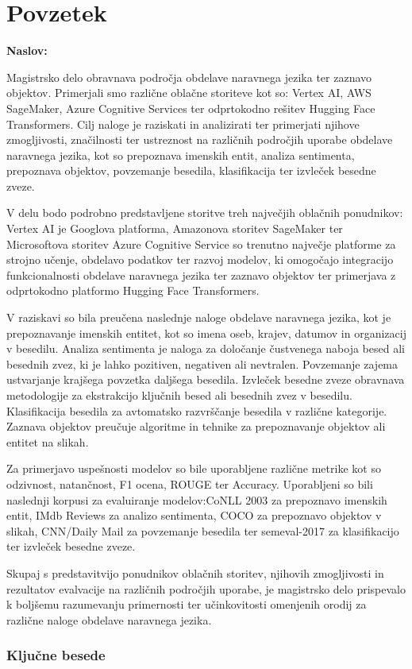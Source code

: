 \chapter*{Povzetek}

\noindent\textbf{Naslov:} \ttitle
\bigskip

Magistrsko delo obravnava področja obdelave naravnega jezika ter zaznavo objektov. Primerjali smo različne oblačne storiteve kot so: Vertex AI, AWS SageMaker, Azure Cognitive Services ter odprtokodno rešitev Hugging Face Transformers. Cilj naloge je raziskati in analizirati ter primerjati njihove zmogljivosti, značilnosti ter ustreznost na različnih področjih uporabe obdelave naravnega jezika, kot so prepoznava imenskih entit, analiza sentimenta, prepoznava objektov, povzemanje besedila, klasifikacija ter izvleček besedne zveze.

V delu bodo podrobno predstavljene storitve treh največjih oblačnih ponudnikov: Vertex AI je Googlova platforma, Amazonova storitev SageMaker ter Microsoftova storitev Azure Cognitive Service so trenutno največje platforme za strojno učenje, obdelavo podatkov ter razvoj modelov, ki omogočajo integracijo funkcionalnosti obdelave naravnega jezika ter zaznavo objektov ter primerjava z odprtokodno platformo Hugging Face Transformers.

V raziskavi so bila preučena naslednje naloge obdelave naravnega jezika, kot je prepoznavanje imenskih entitet, kot so imena oseb, krajev, datumov in organizacij v besedilu.
Analiza sentimenta je naloga za določanje čustvenega naboja besed ali besednih zvez, ki je lahko pozitiven, negativen ali nevtralen. Povzemanje zajema ustvarjanje krajšega povzetka daljšega besedila. Izvleček besedne zveze obravnava metodologije za ekstrakcijo ključnih besed ali besednih zvez v besedilu. 
Klasifikacija besedila za avtomatsko razvrščanje besedila v različne kategorije. Zaznava objektov preučuje algoritme in tehnike za prepoznavanje objektov ali entitet na slikah.

Za primerjavo uspešnosti modelov so bile uporabljene različne metrike kot so odzivnost, natančnost, F1 ocena, ROUGE ter Accuracy. Uporabljeni so bili naslednji korpusi za  evaluiranje modelov:CoNLL 2003 za prepoznavo imenskih entit, IMdb Reviews za analizo sentimenta, COCO za prepoznavo objektov v slikah, CNN/Daily Mail za povzemanje besedila ter semeval-2017 za klasifikacijo ter izvleček besedne zveze.

Skupaj s predstavitvijo ponudnikov oblačnih storitev, njihovih zmogljivosti in rezultatov evalvacije na različnih področjih uporabe, je magistrsko delo prispevalo k boljšemu razumevanju primernosti ter učinkovitosti omenjenih orodij za različne naloge obdelave naravnega jezika.

\subsection*{Ključne besede}
\textit{\tkeywords}
\clearemptydoublepage 